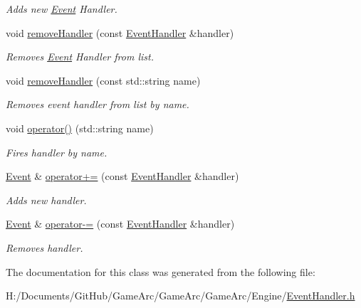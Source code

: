 \begin{DoxyCompactItemize}
\begin{DoxyCompactList}\small\item\em Adds new \hyperlink{class_event}{Event} Handler. \end{DoxyCompactList}\item 
\hypertarget{class_event_a2f1428fb85f6b18a4ebda87b4dd4c52a}{void \hyperlink{class_event_a2f1428fb85f6b18a4ebda87b4dd4c52a}{remove\+Handler} (const \hyperlink{class_event_handler}{Event\+Handler} \&handler)}\label{class_event_a2f1428fb85f6b18a4ebda87b4dd4c52a}

\begin{DoxyCompactList}\small\item\em Removes \hyperlink{class_event}{Event} Handler from list. \end{DoxyCompactList}\item 
\hypertarget{class_event_aa747543d37a7c6a5f36a8ae936b2570f}{void \hyperlink{class_event_aa747543d37a7c6a5f36a8ae936b2570f}{remove\+Handler} (const std\+::string name)}\label{class_event_aa747543d37a7c6a5f36a8ae936b2570f}

\begin{DoxyCompactList}\small\item\em Removes event handler from list by name. \end{DoxyCompactList}\item 
\hypertarget{class_event_a2d7239dd7af997cfe4d52a5e3338a84e}{void \hyperlink{class_event_a2d7239dd7af997cfe4d52a5e3338a84e}{operator()} (std\+::string name)}\label{class_event_a2d7239dd7af997cfe4d52a5e3338a84e}

\begin{DoxyCompactList}\small\item\em Fires handler by name. \end{DoxyCompactList}\item 
\hypertarget{class_event_a76d4a7410cab58baeb0b7f2bf6adb4a4}{\hyperlink{class_event}{Event} \& \hyperlink{class_event_a76d4a7410cab58baeb0b7f2bf6adb4a4}{operator+=} (const \hyperlink{class_event_handler}{Event\+Handler} \&handler)}\label{class_event_a76d4a7410cab58baeb0b7f2bf6adb4a4}

\begin{DoxyCompactList}\small\item\em Adds new handler. \end{DoxyCompactList}\item 
\hypertarget{class_event_ab5cdb51d593ed01fcd4d1c8dd781db72}{\hyperlink{class_event}{Event} \& \hyperlink{class_event_ab5cdb51d593ed01fcd4d1c8dd781db72}{operator-\/=} (const \hyperlink{class_event_handler}{Event\+Handler} \&handler)}\label{class_event_ab5cdb51d593ed01fcd4d1c8dd781db72}

\begin{DoxyCompactList}\small\item\em Removes handler. \end{DoxyCompactList}\end{DoxyCompactItemize}


The documentation for this class was generated from the following file\+:\begin{DoxyCompactItemize}
\item 
H\+:/\+Documents/\+Git\+Hub/\+Game\+Arc/\+Game\+Arc/\+Game\+Arc/\+Engine/\hyperlink{_event_handler_8h}{Event\+Handler.\+h}\end{DoxyCompactItemize}
